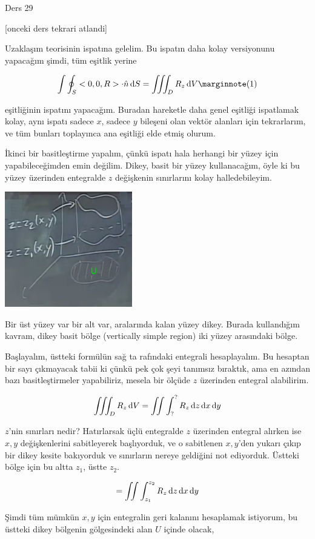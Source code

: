 \documentclass[12pt,fleqn]{article}\usepackage{../../common}
\begin{document}
Ders 29

[onceki ders tekrari atlandi]

Uzaklaşım teorisinin ispatına gelelim. Bu ispatın daha kolay versiyonunu
yapacağım şimdi, tüm eşitlik yerine

$$
\int \oint_S < 0,0,R > \cdot \hat{n} \ud S =
\iiint_D R_z \ud V
\mlabel{1}
$$

eşitliğinin ispatını yapacağım. Buradan hareketle daha genel eşitliği
ispatlamak kolay, aynı ispatı sadece $x$, sadece $y$ bileşeni olan
vektör alanları için tekrarlarım, ve tüm bunları toplayınca ana eşitliği
elde etmiş olurum.

İkinci bir basitleştirme yapalım, çünkü ispatı hala herhangi bir yüzey için
yapabileceğimden emin değilim. Dikey, basit bir yüzey kullanacağım, öyle ki
bu yüzey üzerinden entegralde $z$ değişkenin sınırlarını kolay halledebileyim.

\includegraphics[width=15em]{calc_multi_29_01.png}

Bir üst yüzey var bir alt var, aralarında kalan yüzey dikey. Burada kullandığım
kavram, dikey basit bölge (vertically simple region) iki yüzey arasındaki bölge.

Başlayalım, üstteki formülün sağ ta rafındaki entegrali hesaplayalım. Bu
hesaptan bir sayı çıkmayacak tabii ki çünkü pek çok şeyi tanımsız bıraktık, ama
en azından bazı basitleştirmeler yapabiliriz, mesela bir ölçüde $z$ üzerinden
entegral alabilirim. 

$$
\iiint_D R_z \,\mathrm{d} V = \iint \int_?^? R_z \,\mathrm{d} z \,\mathrm{d} x \,\mathrm{d} y
$$

$z$'nin sınırları nedir? Hatırlarsak üçlü entegralde $z$ üzerinden entegral
alırken ise $x,y$ değişkenlerini sabitleyerek başlıyorduk, ve o sabitlenen
$x,y$'den yukarı çıkıp bir dikey kesite bakıyorduk ve sınırların nereye
geldiğini not ediyorduk. Üstteki bölge için bu altta $z_1$, üstte $z_2$. 

$$
= \iint \int_{z_1}^{z_2} R_z \,\mathrm{d} z \,\mathrm{d} x \,\mathrm{d} y
$$

Şimdi tüm mümkün $x,y$ için entegralin geri kalanını hesaplamak istiyorum,
bu üstteki dikey bölgenin gölgesindeki alan $U$ içinde olacak, 
\end{document}
